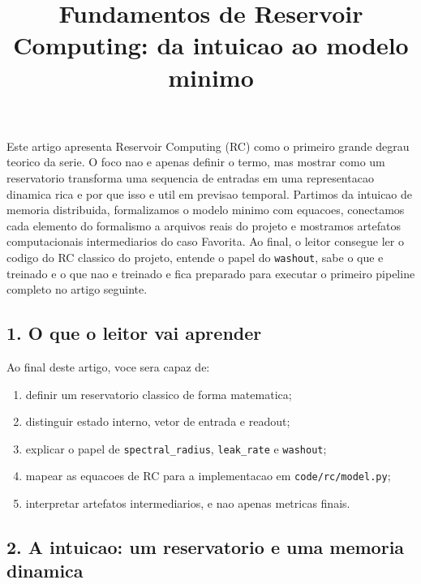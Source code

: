 \documentclass[12pt]{article}
\title{Fundamentos de Reservoir Computing: da intuicao ao modelo minimo}
\author{}
\providecommand{\tightlist}{%
          \setlength{\itemsep}{0pt}\setlength{\parskip}{0pt}}
\begin{document}
        \maketitle

        \begin{resumo}
        Este artigo apresenta Reservoir Computing (RC) como o primeiro grande degrau teorico da serie. O foco nao e apenas definir o termo, mas mostrar como um reservatorio transforma uma sequencia de entradas em uma representacao dinamica rica e por que isso e util em previsao temporal. Partimos da intuicao de memoria distribuida, formalizamos o modelo minimo com equacoes, conectamos cada elemento do formalismo a arquivos reais do projeto e mostramos artefatos computacionais intermediarios do caso Favorita. Ao final, o leitor consegue ler o codigo do RC classico do projeto, entende o papel do \texttt{washout}, sabe o que e treinado e o que nao e treinado e fica preparado para executar o primeiro pipeline completo no artigo seguinte.
        \end{resumo}

        \subsection{1. O que o leitor vai aprender}\label{1-o-que-o-leitor-vai-aprender}

Ao final deste artigo, voce sera capaz de:

\begin{enumerate}
\def\labelenumi{\arabic{enumi}.}
\tightlist
\item
  definir um reservatorio classico de forma matematica;
\item
  distinguir estado interno, vetor de entrada e readout;
\item
  explicar o papel de \texttt{spectral\_radius}, \texttt{leak\_rate} e \texttt{washout};
\item
  mapear as equacoes de RC para a implementacao em \texttt{code/rc/model.py};
\item
  interpretar artefatos intermediarios, e nao apenas metricas finais.
\end{enumerate}

\subsection{2. A intuicao: um reservatorio e uma memoria dinamica}\label{2-a-intuicao-um-reservatorio-e-uma-memoria-dinamica}
\end{document}
